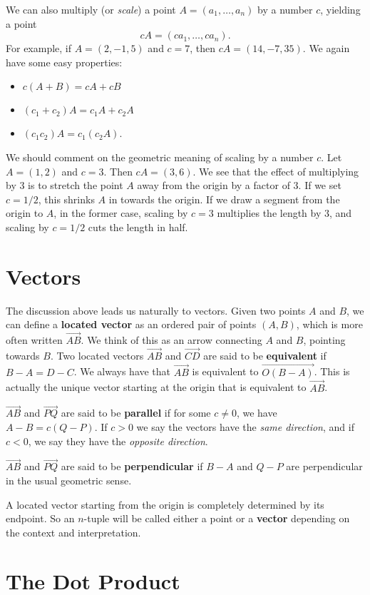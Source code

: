 \documentclass{article}
\begin{document}
We can also multiply (or \emph{scale}) a point $A=(a_1,\ldots,a_n)$ by a number $c$, yielding a point
\[cA = (ca_1, \ldots, ca_n).\]
For example, if $A=(2,-1,5)$ and $c=7$, then $cA=(14,-7,35)$.
We again have some easy properties:
\begin{itemize}
    \item $c(A+B)=cA + cB$
    \item $(c_1 + c_2)A = c_1 A + c_2 A$
    \item $(c_1 c_2)A = c_1(c_2 A)$.
\end{itemize}
We should comment on the geometric meaning of scaling by a number $c$. 
Let $A=(1,2)$ and $c=3$. Then $cA=(3,6)$. We see that the effect of multiplying by $3$ is to
stretch the point $A$ away from the origin by a factor of $3$. If we set $c=1/2$, this 
shrinks $A$ in towards the origin. If we draw a segment from the origin to $A$, in the former case,
scaling by $c=3$ multiplies the length by $3$, and scaling by $c=1/2$ cuts the length in half.

\section*{Vectors}
The discussion above leads us naturally to vectors. Given two points $A$ and $B$,
we can define a \textbf{located vector} as an ordered pair of points $(A,B)$, which is more
often written $\overrightarrow{AB}$. We think of this as an arrow connecting $A$ and $B$,
pointing towards $B$. Two located vectors $\overrightarrow{AB}$ and $\overrightarrow{CD}$
are said to be \textbf{equivalent} if $B-A=D-C$. We always have that
$\overrightarrow{AB}$ is equivalent to $\overrightarrow{O(B-A)}$. This is actually the unique
vector starting at the origin that is equivalent to $\overrightarrow{AB}$.

$\overrightarrow{AB}$ and $\overrightarrow{PQ}$ are said to be \textbf{parallel} if 
for some $c\neq 0$, we have $A-B = c(Q-P)$. If $c>0$ we say the vectors have the \emph{same direction},
and if $c<0$, we say they have the \emph{opposite direction}. 

$\overrightarrow{AB}$ and $\overrightarrow{PQ}$ are said to be \textbf{perpendicular} if 
$B - A$ and $Q - P$ are perpendicular in the usual geometric sense.

A located vector starting from the origin is completely determined by its
endpoint. So an $n$-tuple will be called either a point or a \textbf{vector}
depending on the context and interpretation. 
\section*{The Dot Product}
\end{document}
